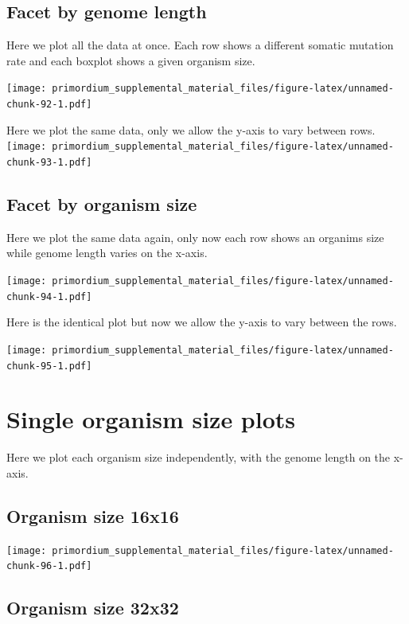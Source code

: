\documentclass[]{book}
\begin{document}
\hypertarget{facet-by-genome-length-1}{%
\subsection{Facet by genome length}\label{facet-by-genome-length-1}}

Here we plot all the data at once.
Each row shows a different somatic mutation rate and each boxplot shows a given organism size.

\texttt{[image: primordium\_supplemental\_material\_files/figure-latex/unnamed-chunk-92-1.pdf]}

Here we plot the same data, only we allow the y-axis to vary between rows.
\texttt{[image: primordium\_supplemental\_material\_files/figure-latex/unnamed-chunk-93-1.pdf]}

\hypertarget{facet-by-organism-size-3}{%
\subsection{Facet by organism size}\label{facet-by-organism-size-3}}

Here we plot the same data again, only now each row shows an organims size while genome length varies on the x-axis.

\texttt{[image: primordium\_supplemental\_material\_files/figure-latex/unnamed-chunk-94-1.pdf]}

Here is the identical plot but now we allow the y-axis to vary between the rows.

\texttt{[image: primordium\_supplemental\_material\_files/figure-latex/unnamed-chunk-95-1.pdf]}

\hypertarget{single-organism-size-plots-4}{%
\section{Single organism size plots}\label{single-organism-size-plots-4}}

Here we plot each organism size independently, with the genome length on the x-axis.

\hypertarget{organism-size-16x16-3}{%
\subsection{Organism size 16x16}\label{organism-size-16x16-3}}

\texttt{[image: primordium\_supplemental\_material\_files/figure-latex/unnamed-chunk-96-1.pdf]}

\hypertarget{organism-size-32x32-3}{%
\subsection{Organism size 32x32}\label{organism-size-32x32-3}}
\end{document}
